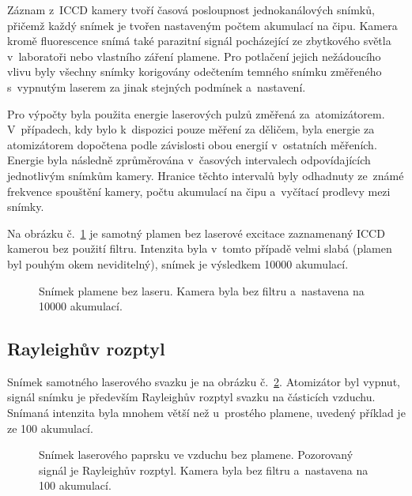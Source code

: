 Záznam z~ICCD kamery tvoří časová posloupnost jednokanálových sním\-ků,
přičemž každý snímek je tvořen nastaveným počtem akumulací na čipu.
Kamera kromě fluorescence snímá také parazitní signál pocházející
ze zbytkového světla v~laboratoři nebo vlastního záření plamene.
Pro potlačení jejich nežádoucího vlivu
byly všechny snímky korigovány odečtením temného snímku změřeného
s~vypnutým laserem za jinak stejných podmínek a~nastavení.

Pro výpočty byla použita energie laserových pulzů změřená za~atomizátorem.
V~případech, kdy bylo k~dispozici pouze měření za děličem,
byla energie za atomizátorem dopočtena podle závislosti obou energií
v~ostatních měřeních.
Energie byla následně zprůměrována v~časových intervalech odpovídajících
jednotlivým snímkům kamery.
Hranice těchto intervalů byly odhadnuty ze~známé frekvence spouštění
kamery, počtu akumulací na čipu a~vyčítací prodlevy mezi sním\-ky.

Na obrázku č.~\ref{fig:lif-flame} je samotný plamen bez laserové excitace
zaznamenaný ICCD kamerou bez použití filtru.
Intenzita byla v~tomto případě velmi slabá
(plamen byl pouhým okem neviditelný),
snímek je výsledkem \num{10000} akumulací.

\begin{figure}[p]
	\centering
	
	\caption{Snímek plamene bez laseru.
		Kamera byla bez filtru a~nastavena na \num{10000} akumulací.}
	\label{fig:lif-flame}
\end{figure}

\subsection{Rayleighův rozptyl}
\label{sec:lif-rayleigh}

Snímek samotného laserového svazku je na obrázku č.~\ref{fig:lif-beam}.
Atomizátor byl vypnut, signál snímku je především Rayleighův rozptyl
svazku na částicích vzduchu.
Snímaná intenzita byla mnohem větší než u~prostého plamene,
uvedený příklad je ze \num{100} akumulací.

\begin{figure}[p]
	\centering
	
	\caption{Snímek laserového paprsku ve vzduchu bez plamene.
		Pozorovaný signál je Rayleighův rozptyl.
		Kamera byla bez filtru a~nastavena na \num{100} akumulací.}
	\label{fig:lif-beam}
\end{figure}

